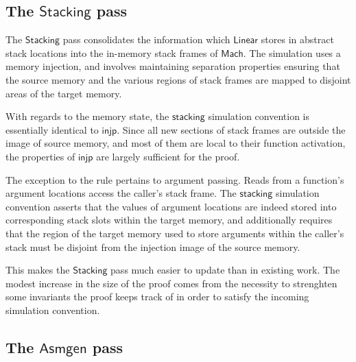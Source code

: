 \documentclass[sigplan,10pt,review,anonymous]{acmart}
\newcommand{\kw}[1]{\ensuremath{ \mathsf{#1} }}
\begin{document}

\subsection{The \kw{Stacking} pass} %

The \kw{Stacking} pass
consolidates the information which
\kw{Linear} stores in abstract stack locations
into the in-memory stack frames of \kw{Mach}.
The simulation uses a memory injection,
and involves maintaining separation properties
ensuring that the source memory and
the various regions of stack frames
are mapped to disjoint areas of the target memory.

With regards to the memory state,
the \kw{stacking} simulation convention
is essentially identical to \kw{injp}.
Since all new sections of stack frames
are outside the image of source memory,
and most of them are local to
their function activation,
the properties of \kw{injp}
are largely sufficient for the proof.

The exception to the rule pertains to argument passing.
Reads from a function's argument locations
access the caller's stack frame.
The \kw{stacking} simulation convention
asserts that the values of argument locations
are indeed stored into corresponding stack slots
within the target memory,
and additionally
requires that the region of the target memory
used to store arguments within the caller's stack
must be disjoint from the injection image of the source memory.

This makes the \kw{Stacking} pass
much easier to update than in existing work.
The modest increase in the size of the proof
comes from the necessity to strenghten
some invariants the proof keeps track of
in order to satisfy the incoming simulation convention.


\subsection{The \kw{Asmgen} pass} %
\end{document}
